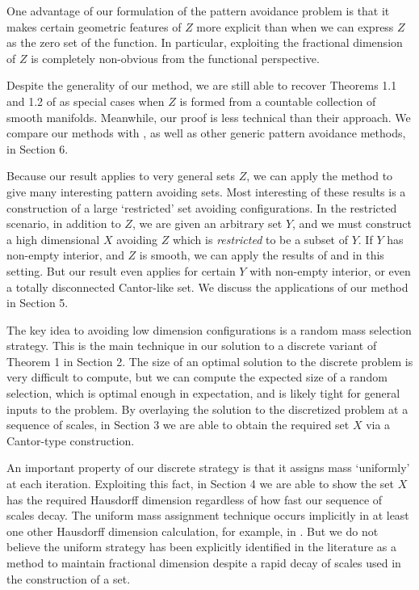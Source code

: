 \documentclass[usenames,dvipsnames]{article}
\theoremstyle{plain}
\theoremstyle{plain}
\begin{document}
One advantage of our formulation of the pattern avoidance problem is that it makes certain geometric features of $Z$ more explicit than when we can  express $Z$ as the zero set of the function. In particular, exploiting the fractional dimension of $Z$ is completely non-obvious from the functional perspective.

Despite the generality of our method, we are still able to recover Theorems 1.1 and 1.2 of \cite{MalabikaRob} as special cases when $Z$ is formed from a countable collection of smooth manifolds. Meanwhile, our proof is less technical than their approach. We compare our methods with \cite{MalabikaRob}, as well as other generic pattern avoidance methods, in Section 6.

Because our result applies to very general sets $Z$, we can apply the method to give many interesting pattern avoiding sets. Most interesting of these results is a construction of a large `restricted' set avoiding configurations. In the restricted scenario, in addition to $Z$, we are given an arbitrary set $Y$, and we must construct a high dimensional $X$ avoiding $Z$ which is {\it restricted} to be a subset of $Y$. If $Y$ has non-empty interior, and $Z$ is smooth, we can apply the results of \cite{MalabikaRob} and \cite{Mathe} in this setting. But our result even applies for certain $Y$ with non-empty interior, or even a totally disconnected Cantor-like set. We discuss the applications of our method in Section 5.

The key idea to avoiding low dimension configurations is a random mass selection strategy. This is the main technique in our solution to a discrete variant of Theorem 1 in Section 2. The size of an optimal solution to the discrete problem is very difficult to compute, but we can compute the expected size of a random selection, which is optimal enough in expectation, and is likely tight for general inputs to the problem. By overlaying the solution to the discretized problem at a sequence of scales, in Section 3 we are able to obtain the required set $X$ via a Cantor-type construction.

An important property of our discrete strategy is that it assigns mass `uniformly' at each iteration. Exploiting this fact, in Section 4 we are able to show the set $X$ has the required Hausdorff dimension regardless of how fast our sequence of scales decay. The uniform mass assignment technique occurs implicitly in at least one other Hausdorff dimension calculation, for example, in \cite{MalabikaRob}. But we do not believe the uniform strategy has been explicitly identified in the literature as a method to maintain fractional dimension despite a rapid decay of scales used in the construction of a set.
\end{document}
